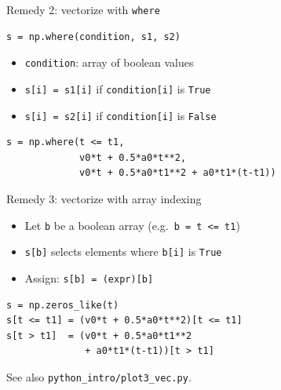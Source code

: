 \begin{frame}[fragile]{Remedy 2: vectorize with \texttt{where}}
\begin{lstlisting}[style=pythoncompact]
s = np.where(condition, s1, s2)
\end{lstlisting}
  \begin{itemize}
    \item \texttt{condition}: array of boolean values
    \item \texttt{s[i] = s1[i]} if \texttt{condition[i]} is \texttt{True}
    \item \texttt{s[i] = s2[i]} if \texttt{condition[i]} is \texttt{False}
  \end{itemize}
\begin{lstlisting}[style=pythonTiny]
s = np.where(t <= t1,
             v0*t + 0.5*a0*t**2,
             v0*t + 0.5*a0*t1**2 + a0*t1*(t-t1))
\end{lstlisting}
\end{frame}

\begin{frame}[fragile]{Remedy 3: vectorize with array indexing}
  \begin{itemize}
    \item Let \texttt{b} be a boolean array (e.g.\ \texttt{b = t <= t1})
    \item \texttt{s[b]} selects elements where \texttt{b[i]} is \texttt{True}
    \item Assign: \texttt{s[b] = (expr)[b]}
  \end{itemize}
\begin{lstlisting}[style=pythonTiny]
s = np.zeros_like(t)
s[t <= t1] = (v0*t + 0.5*a0*t**2)[t <= t1]
s[t > t1]  = (v0*t + 0.5*a0*t1**2
              + a0*t1*(t-t1))[t > t1]
\end{lstlisting}
  See also \texttt{python\_intro/plot3\_vec.py}.
\end{frame}
